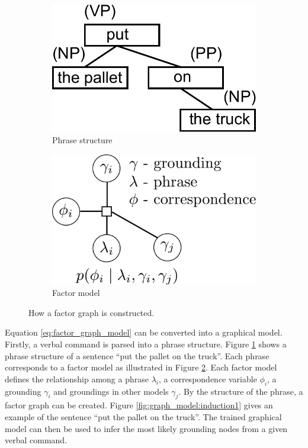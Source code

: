 \documentclass[phd]{byuprop}
\begin{document}
\begin{figure}[htbp]
	\centering
	\begin{subfigure}[t]{0.35\linewidth}
		\centering
		\includegraphics[width=.8\textwidth]{fig/phrase_structure}
		\caption{Phrase structure}
		\label{fig:factor:phrase_structure}
	\end{subfigure}  
	\begin{subfigure}[t]{0.35\linewidth}
		\centering
		\includegraphics[width=\textwidth]{fig/factor_model}
		\caption{Factor model}
		\label{fig:factor:factor_model}
	\end{subfigure}   
	\caption{How a factor graph is constructed.}
	\label{fig:factor_graph}
\end{figure}
Equation \eqref{eq:factor_graph_model} can be converted into a graphical model.
Firstly, a verbal command is parsed into a phrase structure.
Figure \ref{fig:factor:phrase_structure} shows a phrase structure of a sentence ``put the pallet on the truck''.
Each phrase corresponds to a factor model as illustrated in Figure \ref{fig:factor:factor_model}.
Each factor model defines the relationship among a phrase $ \lambda_i $, a correspondence variable $ \phi_i $, a grounding $ \gamma_i $ and groundings in other models $ \gamma_j $.
By the structure of the phrase, a factor graph can be created. 
Figure \ref{fig:graph_model:induction1} gives an example of the sentence ``put the pallet on the truck''.
The trained graphical model can then be used to infer the most likely grounding nodes from a given verbal command.
\end{document}
